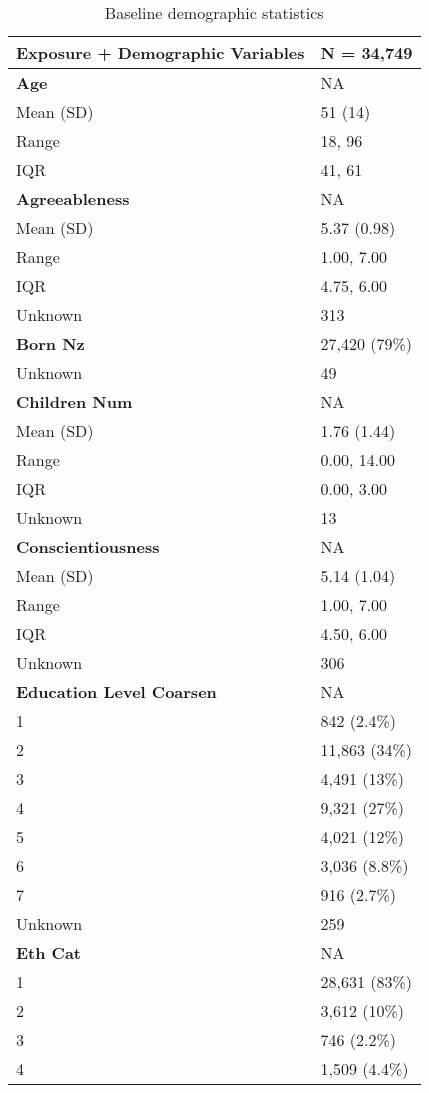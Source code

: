 \documentclass[
  single column]{article}
\begin{document}
\begin{longtable}[]{@{}ll@{}}

\caption{\label{tbl-table-demography}Baseline demographic statistics}

\tabularnewline

\toprule\noalign{}
\textbf{Exposure + Demographic Variables} & \textbf{N = 34,749} \\
\midrule\noalign{}
\endhead
\bottomrule\noalign{}
\endlastfoot
\textbf{Age} & NA \\
Mean (SD) & 51 (14) \\
Range & 18, 96 \\
IQR & 41, 61 \\
\textbf{Agreeableness} & NA \\
Mean (SD) & 5.37 (0.98) \\
Range & 1.00, 7.00 \\
IQR & 4.75, 6.00 \\
Unknown & 313 \\
\textbf{Born Nz} & 27,420 (79\%) \\
Unknown & 49 \\
\textbf{Children Num} & NA \\
Mean (SD) & 1.76 (1.44) \\
Range & 0.00, 14.00 \\
IQR & 0.00, 3.00 \\
Unknown & 13 \\
\textbf{Conscientiousness} & NA \\
Mean (SD) & 5.14 (1.04) \\
Range & 1.00, 7.00 \\
IQR & 4.50, 6.00 \\
Unknown & 306 \\
\textbf{Education Level Coarsen} & NA \\
1 & 842 (2.4\%) \\
2 & 11,863 (34\%) \\
3 & 4,491 (13\%) \\
4 & 9,321 (27\%) \\
5 & 4,021 (12\%) \\
6 & 3,036 (8.8\%) \\
7 & 916 (2.7\%) \\
Unknown & 259 \\
\textbf{Eth Cat} & NA \\
1 & 28,631 (83\%) \\
2 & 3,612 (10\%) \\
3 & 746 (2.2\%) \\
4 & 1,509 (4.4\%) \\

\end{longtable}
\end{document}
